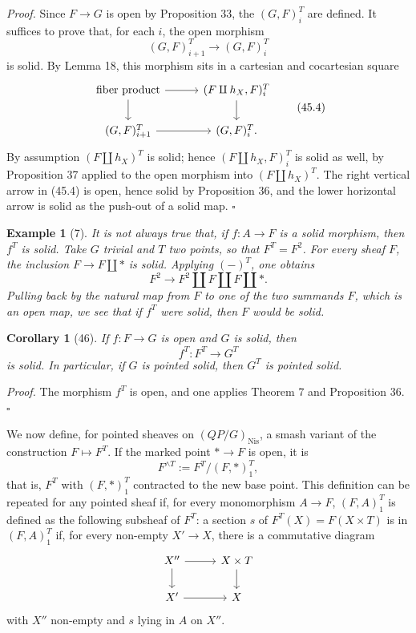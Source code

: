 \documentclass[11pt]{article}
\newcommand{\Nis}{\mathrm{Nis}}
\newcommand{\pt}{*}
\theoremstyle{deligne}
\newtheorem*{corollary*}{Corollary}
\newtheorem*{example*}{Example}
\newenvironment{proofdel}{\noindent\textit{Proof.}}{\hfill$\square$}
\begin{document}
\begin{proofdel}
Since \(F\to G\) is open by Proposition 33, the \((G,F)^T_i\) are defined. It suffices to prove that, for each \(i\), the open morphism
\[
(G,F)^T_{i+1}\longrightarrow (G,F)^T_i
\]
is solid. By Lemma 18, this morphism sits in a cartesian and cocartesian square
\[
\begin{tikzcd}[column sep=3.0em,row sep=1.8em]
\text{fiber product} \arrow[r] \arrow[d] &
(F\amalg h_X,F)^T_i \arrow[d]\\
(G,F)^T_{i+1} \arrow[r] &
(G,F)^T_i .
\end{tikzcd}
\tag{45.4}
\]
By assumption \((F\amalg h_X)^T\) is solid; hence \((F\amalg h_X,F)^T_i\) is solid as well, by Proposition 37 applied to the open morphism into \((F\amalg h_X)^T\). The right vertical arrow in (45.4) is open, hence solid by Proposition 36, and the lower horizontal arrow is solid as the push-out of a solid map.
\end{proofdel}

\begin{example*}[7]
It is not always true that, if \(f:A\to F\) is a solid morphism, then \(f^T\) is solid. Take \(G\) trivial and \(T\) two points, so that \(F^T=F^2\). For every sheaf \(F\), the inclusion \(F\to F\amalg\pt\) is solid. Applying \((-)^T\), one obtains
\[
F^2\longrightarrow F^2\amalg F\amalg F\amalg \pt .
\]
Pulling back by the natural map from \(F\) to one of the two summands \(F\), which is an open map, we see that if \(f^T\) were solid, then \(F\) would be solid.
\end{example*}

\begin{corollary*}[46]
If \(f:F\to G\) is open and \(G\) is solid, then
\[
f^T:F^T\longrightarrow G^T
\]
is solid. In particular, if \(G\) is pointed solid, then \(G^T\) is pointed solid.
\end{corollary*}

\begin{proofdel}
The morphism \(f^T\) is open, and one applies Theorem 7 and Proposition 36.
\end{proofdel}

We now define, for pointed sheaves on \((QP/G)_{\Nis}\), a smash variant of the construction \(F\mapsto F^T\). If the marked point \(\pt\to F\) is open, it is
\[
F^{\wedge T}:=F^T/(F,\pt)^T_1,
\]
that is, \(F^T\) with \((F,\pt)^T_1\) contracted to the new base point. This definition can be repeated for any pointed sheaf if, for every monomorphism \(A\to F\), \((F,A)^T_1\) is defined as the following subsheaf of \(F^T\): a section \(s\) of \(F^T(X)=F(X\times T)\) is in \((F,A)^T_1\) if, for every non-empty \(X'\to X\), there is a commutative diagram
\[
\begin{tikzcd}[column sep=2.8em,row sep=1.7em]
X'' \arrow[r] \arrow[d] & X\times T \arrow[d]\\
X' \arrow[r] & X
\end{tikzcd}
\]
with \(X''\) non-empty and \(s\) lying in \(A\) on \(X''\).
\end{document}
